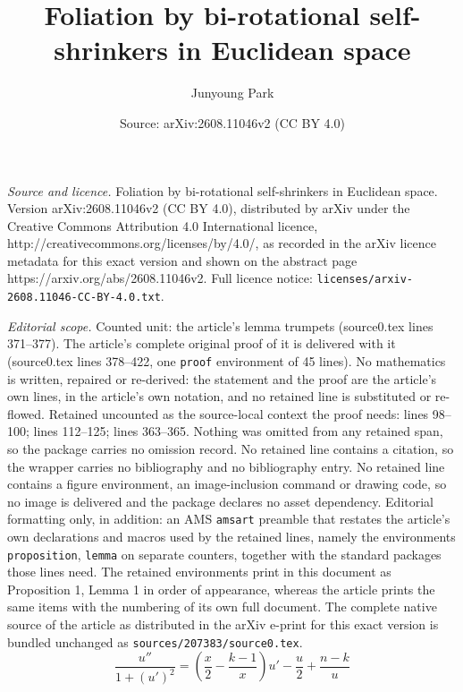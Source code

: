 \documentclass[10pt,a4paper]{amsart}
\title{Foliation by bi-rotational self-shrinkers in Euclidean space}
\author{Junyoung Park}
\date{Source: arXiv:2608.11046v2 (CC BY 4.0)}
\begin{document}
\maketitle

\noindent\emph{Source and licence.} Foliation by bi-rotational self-shrinkers in Euclidean space. Version arXiv:2608.11046v2 (CC BY 4.0), distributed by arXiv under the Creative Commons Attribution 4.0 International licence, http://creativecommons.org/licenses/by/4.0/, as recorded in the arXiv licence metadata for this exact version and shown on the abstract page https://arxiv.org/abs/2608.11046v2. Full licence notice: \texttt{licenses/arxiv-2608.11046-CC-BY-4.0.txt}.\par\smallskip

\noindent\textit{Editorial scope.} Counted unit: the article's lemma trumpets (source0.tex lines 371--377). The article's complete original proof of it is delivered with it (source0.tex lines 378--422, one \texttt{proof} environment of 45 lines). No mathematics is written, repaired or re-derived: the statement and the proof are the article's own lines, in the article's own notation, and no retained line is substituted or re-flowed.  Retained uncounted as the source-local context the proof needs: lines 98--100; lines 112--125; lines 363--365.  Nothing was omitted from any retained span, so the package carries no omission record.  No retained line contains a citation, so the wrapper carries no bibliography and no bibliography entry.  No retained line contains a figure environment, an image-inclusion command or drawing code, so no image is delivered and the package declares no asset dependency.  Editorial formatting only, in addition: an AMS \texttt{amsart} preamble that restates the article's own declarations and macros used by the retained lines, namely the environments \texttt{proposition}, \texttt{lemma} on separate counters, together with the standard packages those lines need.  The retained environments print in this document as Proposition 1, Lemma 1 in order of appearance, whereas the article prints the same items with the numbering of its own full document.  The complete native source of the article as distributed in the arXiv e-print for this exact version is bundled unchanged as \texttt{sources/207383/source0.tex}.
\begin{equation}
    \frac{u''}{1 + (u')^2} = (\frac{x}{2} - \frac{k-1}{x})u' - \frac{u}{2} + \frac{n-k}{u}\label{Main ODE y = u(x)}
\end{equation}
\end{document}
